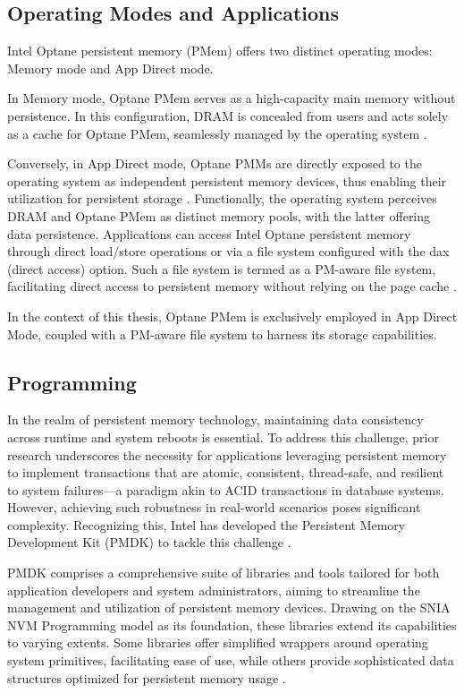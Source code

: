 \subsection{Operating Modes and Applications}

Intel Optane persistent memory (PMem) offers two distinct operating modes: Memory mode and App Direct mode.

In Memory mode, Optane PMem serves as a high-capacity main memory without persistence. In this configuration, DRAM is concealed from users and acts solely as a cache for Optane PMem, seamlessly managed by the operating system \cite{yang2020empirical}. 

Conversely, in App Direct mode, Optane PMMs are directly exposed to the operating system as independent persistent memory devices, thus enabling their utilization for persistent storage \cite{izraelevitz2019basic}. Functionally, the operating system perceives DRAM and Optane PMem as distinct memory pools, with the latter offering data persistence. Applications can access Intel Optane persistent memory through direct load/store operations or via a file system configured with the \textrm{dax} (direct access) option. Such a file system is termed as a PM-aware file system, facilitating direct access to persistent memory without relying on the page cache \cite{rudoff2017persistent,Speeding28:online}.

In the context of this thesis, Optane PMem is exclusively employed in App Direct Mode, coupled with a PM-aware file system to harness its storage capabilities.

\subsection{Programming}

In the realm of persistent memory technology, maintaining data consistency across runtime and system reboots is essential. To address this challenge, prior research underscores the necessity for applications leveraging persistent memory to implement transactions that are atomic, consistent, thread-safe, and resilient to system failures—a paradigm akin to ACID transactions in database systems. However, achieving such robustness in real-world scenarios poses significant complexity. Recognizing this, Intel has developed the Persistent Memory Development Kit (PMDK) to tackle this challenge \cite{scargall2020pmem,rudoff2017persistent}.

PMDK comprises a comprehensive suite of libraries and tools tailored for both application developers and system administrators, aiming to streamline the management and utilization of persistent memory devices. Drawing on the SNIA NVM Programming model \cite{NVMProgr73:online} as its foundation, these libraries extend its capabilities to varying extents. Some libraries offer simplified wrappers around operating system primitives, facilitating ease of use, while others provide sophisticated data structures optimized for persistent memory usage \cite{scargall2020pmem}.

